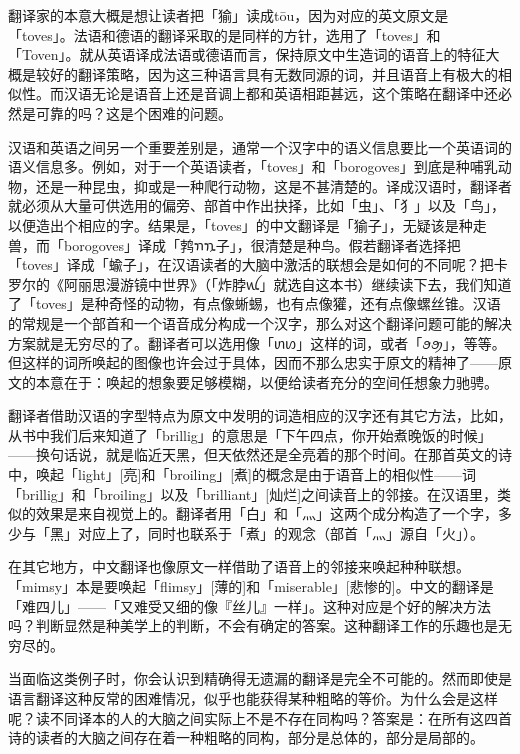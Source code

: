 \documentclass[
  12pt,
  twoside,
  openright,
  oldfontcommands,
]{memoir}
\begin{document}
翻译家的本意大概是想让读者把「㺄」读成tōu，因为对应的英文原文是「toves」。法语和德语的翻译采取的是同样的方针，选用了「toves」和「Toven」。就从英语译成法语或德语而言，保持原文中生造词的语音上的特征大概是较好的翻译策略，因为这三种语言具有无数同源的词，并且语音上有极大的相似性。而汉语无论是语音上还是音调上都和英语相距甚远，这个策略在翻译中还必然是可靠的吗？这是个困难的问题。

汉语和英语之间另一个重要差别是，通常一个汉字中的语义信息要比一个英语词的语义信息多。例如，对于一个英语读者，「toves」和「borogoves」到底是种哺乳动物，还是一种昆虫，抑或是一种爬行动物，这是不甚清楚的。译成汉语时，翻译者就必须从大量可供选用的偏旁、部首中作出抉择，比如「虫」、「犭」以及「鸟」，以便造出个相应的字。结果是，「toves」的中文翻译是「㺄子」，无疑该是种走兽，而「borogoves」译成「鹁{\gebfont ꪦ}{\gebfont ꪧ}子」，很清楚是种鸟。假若翻译者选择把「toves」译成「蝓子」，在汉语读者的大脑中激活的联想会是如何的不同呢？把卡罗尔的《阿丽思漫游镜中世界》（「炸脖{\gebfont ꪡ}」就选自这本书）继续读下去，我们知道了「toves」是种奇怪的动物，有点像蜥蜴，也有点像獾，还有点像螺丝锥。汉语的常规是一个部首和一个语音成分构成一个汉字，那么对这个翻译问题可能的解决方案就是无穷尽的了。翻译者可以选用像「{\gebfont ꪬ}{\gebfont ꪭ}」这样的词，或者「{\gebfont ꪮ}{\gebfont ꪯ}」，等等。但这样的词所唤起的图像也许会过于具体，因而不那么忠实于原文的精神了------原文的本意在于：唤起的想象要足够模糊，以便给读者充分的空间任想象力驰骋。

翻译者借助汉语的字型特点为原文中发明的词造相应的汉字还有其它方法，比如，从书中我们后来知道了「brillig」的意思是「下午四点，你开始煮晚饭的时候」------换句话说，就是临近天黑，但天依然还是全亮着的那个时间。在那首英文的诗中，唤起「light」{[}亮{]}和「broiling」{[}煮{]}的概念是由于语音上的相似性------词「brillig」和「broiling」以及「brilliant」{[}灿烂{]}之间读音上的邻接。在汉语里，类似的效果是来自视觉上的。翻译者用「白」和「灬」这两个成分构造了一个字，多少与「黑」对应上了，同时也联系于「煮」的观念（部首「灬」源自「火」）。

在其它地方，中文翻译也像原文一样借助了语音上的邻接来唤起种种联想。「mimsy」本是要唤起「flimsy」{[}薄的{]}和「miserable」{[}悲惨的{]}。中文的翻译是「难四儿」------「又难受又细的像『丝儿』一样」。这种对应是个好的解决方法吗？判断显然是种美学上的判断，不会有确定的答案。这种翻译工作的乐趣也是无穷尽的。

当面临这类例子时，你会认识到精确得无遗漏的翻译是完全不可能的。然而即使是语言翻译这种反常的困难情况，似乎也能获得某种粗略的等价。为什么会是这样呢？读不同译本的人的大脑之间实际上不是不存在同构吗？答案是：在所有这四首诗的读者的大脑之间存在着一种粗略的同构，部分是总体的，部分是局部的。
\end{document}
